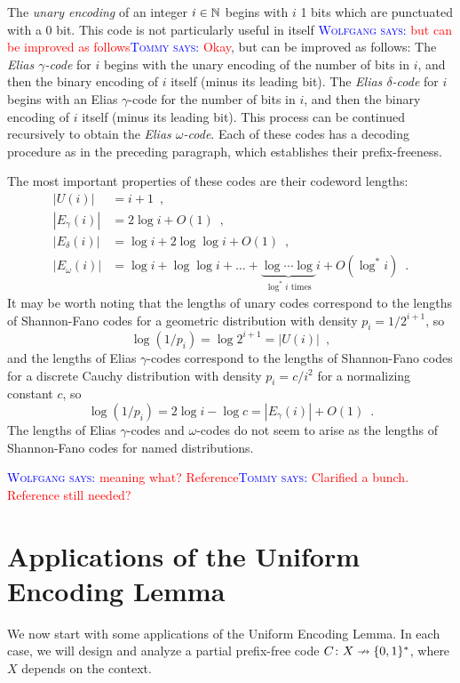 \documentclass{patmorin}
\newcommand{\aremark}[3]{\textcolor{blue}{\textsc{#1 #2:}}
  \textcolor{red}{\textsf{#3}}}
\newcommand{\tommy}[2][says]{\aremark{Tommy}{#1}{#2}}
\newcommand{\wolfgang}[2][says]{\aremark{Wolfgang}{#1}{#2}}
\begin{document}
The \emph{unary encoding} of an integer $i \in \mathbb{N}$ begins with $i$ 1
bits which are punctuated with a 0 bit. This code is not particularly
useful in itself \wolfgang{but can be improved as
  follows}\tommy{Okay}, but can be improved as follows: The
\emph{Elias $\gamma$-code} for $i$ begins with the unary encoding of
the number of bits in $i$, and then the binary encoding of $i$ itself
(minus its leading bit). The \emph{Elias $\delta$-code} for $i$ begins
with an Elias $\gamma$-code for the number of bits in $i$, and then
the binary encoding of $i$ itself (minus its leading bit). This
process can be continued recursively to obtain the \emph{Elias
  $\omega$-code}. Each of these codes has a decoding procedure as in
the preceding paragraph, which establishes their prefix-freeness.

The most important properties of these codes are their codeword
lengths:
\begin{align*}
  |U(i)| &= i + 1 \enspace , \tag{Unary code} \\
  |E_\gamma(i)| &= 2 \log i + O(1) \enspace , \tag{Elias $\gamma$-code} \\
  |E_\delta(i)| &= \log i + 2 \log \log i + O(1) \enspace , \tag{Elias $\delta$-code} \\
  |E_\omega(i)| &= \log i + \log \log i + \dots + \underbrace{\log \cdots \log}_{\text{$\log^* i$ times}}i + O(\log^* i) \enspace . \tag{Elias $\omega$-code}
\end{align*}
It may be worth noting that the lengths of unary codes correspond to
the lengths of Shannon-Fano codes for a geometric distribution with
density $p_i = 1/2^{i + 1}$, so
\[
  \log (1/p_i) = \log 2^{i + 1} = |U(i)| \enspace ,
\]
and the lengths of Elias $\gamma$-codes correspond to the lengths of
Shannon-Fano codes for a discrete Cauchy distribution with density
$p_i = c/i^2$ for a normalizing constant $c$, so
\[
  \log (1/p_i) = 2 \log i - \log c = |E_\gamma(i)| + O(1) \enspace .
\]
The lengths of Elias $\gamma$-codes and $\omega$-codes do not seem to
arise as the lengths of Shannon-Fano codes for named distributions.

\wolfgang{meaning what? Reference}\tommy{Clarified a bunch. Reference
  still needed?}

\section{Applications of the Uniform Encoding Lemma}

We now start with some applications of the Uniform Encoding Lemma. In
each case, we will design and analyze a partial prefix-free code
$C\colon X\nrightarrow \{0, 1\}^*$, where $X$ depends on
the context.
\end{document}
